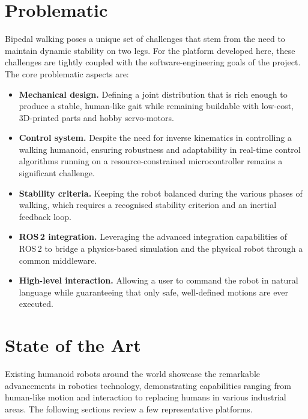 \section{Problematic}
\label{sec:problematic}

Bipedal walking poses a unique set of challenges that stem from the need
to maintain dynamic stability on two legs. For the platform developed
here, these challenges are tightly coupled with the software-engineering
goals of the project. The core problematic aspects are:

\begin{itemize}[itemsep=2pt,topsep=4pt]
  \item \textbf{Mechanical design.} Defining a joint distribution that
        is rich enough to produce a stable, human-like gait while
        remaining buildable with low-cost, 3D-printed parts and hobby
        servo-motors.
  \item \textbf{Control system.} Despite the need for inverse kinematics
        in controlling a walking humanoid, ensuring robustness and
        adaptability in real-time control algorithms running on a
        resource-constrained microcontroller remains a significant
        challenge.
  \item \textbf{Stability criteria.} Keeping the robot balanced during
        the various phases of walking, which requires a recognised
        stability criterion and an inertial feedback loop.
  \item \textbf{ROS\,2 integration.} Leveraging the advanced integration
        capabilities of ROS\,2 to bridge a physics-based simulation and
        the physical robot through a common middleware.
  \item \textbf{High-level interaction.} Allowing a user to command the
        robot in natural language while guaranteeing that only safe,
        well-defined motions are ever executed.
\end{itemize}

\section{State of the Art}
\label{sec:sota}

Existing humanoid robots around the world showcase the remarkable
advancements in robotics technology, demonstrating capabilities ranging
from human-like motion and interaction to replacing humans in various
industrial areas. The following sections review a few representative
platforms.

